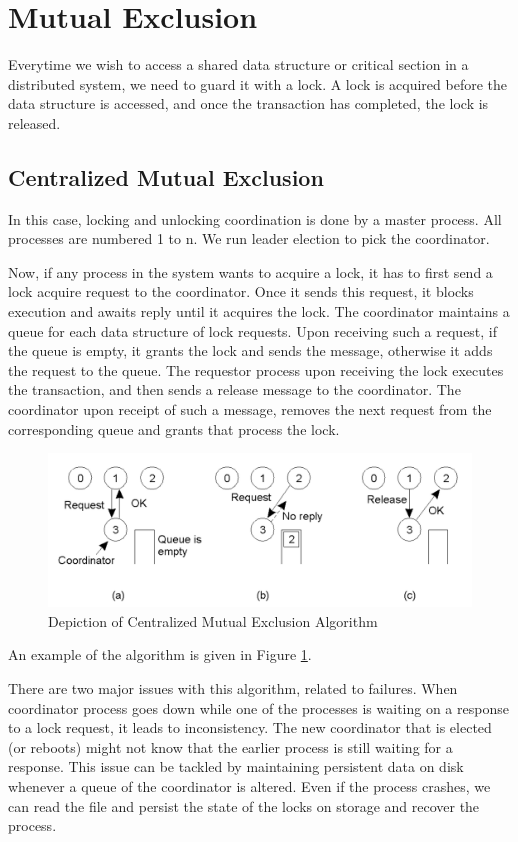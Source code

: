 \documentclass[twoside]{article}
\begin{document}
\section{Mutual Exclusion}
Everytime we wish to access a shared data structure or critical section in a distributed system, we need to guard it with a lock. A lock is acquired before the data structure is accessed, and once the transaction has completed, the lock is released.

\subsection{Centralized Mutual Exclusion}
In this case, locking and unlocking coordination is done by a master process. All processes are numbered 1 to n. We run leader election to pick the coordinator.

Now, if any process in the system wants to acquire a lock, it has to first send a lock acquire request to the coordinator. Once it sends this request, it blocks execution and awaits reply until it acquires the lock. The coordinator maintains a queue for each data structure of lock requests. Upon receiving such a request, if the queue is empty, it grants the lock and sends the message, otherwise it adds the request to the queue. The requestor process upon receiving the lock executes the transaction, and then sends a release message to the coordinator. The coordinator upon receipt of such a message, removes the next request from the corresponding queue and grants that process the lock.

\begin{figure}[h!]
\centering
\includegraphics[scale=0.33]{./centralized.png}
\caption{Depiction of Centralized Mutual Exclusion Algorithm}
\label{fig:centralized}
\end{figure} 
An example of the algorithm is given in Figure \ref{fig:centralized}.

There are two major issues with this algorithm, related to failures. When coordinator process goes down while one of the processes is waiting on a response to a lock request, it leads to inconsistency. The new coordinator that is elected (or reboots) might not know that the earlier process is still waiting for a response. This issue can be tackled by maintaining persistent data on disk whenever a queue of the coordinator is altered. Even if the process crashes, we can read the file and persist the state of the locks on storage and recover the process.
\end{document}
